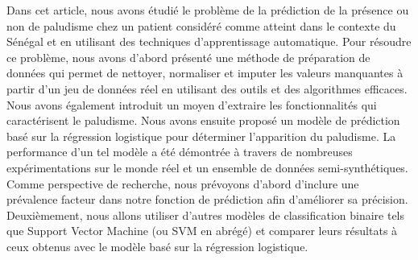 
Dans cet article, nous avons étudié le problème de la prédiction de la présence ou non de paludisme chez un patient considéré comme atteint dans le contexte du Sénégal et en utilisant des techniques d’apprentissage automatique.
Pour résoudre ce problème, nous avons d’abord présenté une méthode de préparation de données qui permet de nettoyer, normaliser et imputer les valeurs manquantes à partir d'un jeu de données réel en utilisant des outils et des algorithmes efficaces. Nous avons également introduit un moyen d’extraire les fonctionnalités qui caractérisent le paludisme. Nous avons ensuite proposé un modèle de prédiction basé sur la régression logistique pour déterminer l'apparition du paludisme. La performance d’un tel modèle a été démontrée à travers de nombreuses expérimentations sur le monde réel et un ensemble de données semi-synthétiques. Comme perspective de recherche, nous prévoyons d’abord d’inclure une prévalence facteur dans notre fonction de prédiction afin d’améliorer sa précision. Deuxièmement, nous allons utiliser d'autres modèles de classification binaire tels que Support Vector Machine (ou SVM en abrégé) et comparer leurs résultats à ceux obtenus avec le modèle basé sur la régression logistique.
